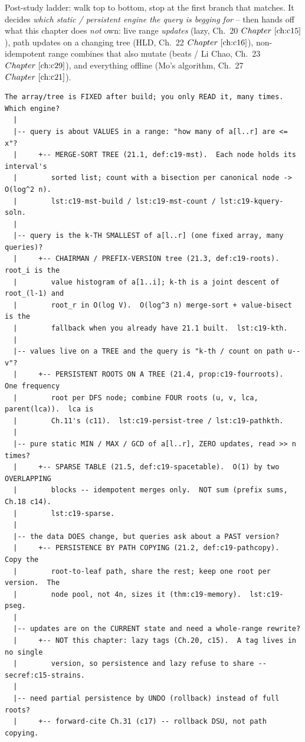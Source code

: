 
Post-study ladder: walk top to bottom, stop at the first branch that matches. It decides
\emph{which static / persistent engine the query is begging for} -- then hands off what this
chapter does \emph{not} own: live range \emph{updates} (lazy, Ch.~20 \(\chref{c15}\)),
path updates on a changing tree (HLD, Ch.~22 \(\chref{c16}\)), non-idempotent range
combines that also mutate (beats / Li Chao, Ch.~23 \(\chref{c29}\)), and everything offline
(Mo's algorithm, Ch.~27 \(\chref{c21}\)).

\begin{lstlisting}[language={}, basicstyle=\ttfamily\small, numbers=none, frame=single]
  The array/tree is FIXED after build; you only READ it, many times.  Which engine?
  |
  |-- query is about VALUES in a range: "how many of a[l..r] are <= x"?
  |     +-- MERGE-SORT TREE (21.1, def:c19-mst).  Each node holds its interval's
  |        sorted list; count with a bisection per canonical node -> O(log^2 n).
  |        lst:c19-mst-build / lst:c19-mst-count / lst:c19-kquery-soln.
  |
  |-- query is the k-TH SMALLEST of a[l..r] (one fixed array, many queries)?
  |     +-- CHAIRMAN / PREFIX-VERSION tree (21.3, def:c19-roots).  root_i is the
  |        value histogram of a[1..i]; k-th is a joint descent of root_(l-1) and
  |        root_r in O(log V).  O(log^3 n) merge-sort + value-bisect is the
  |        fallback when you already have 21.1 built.  lst:c19-kth.
  |
  |-- values live on a TREE and the query is "k-th / count on path u--v"?
  |     +-- PERSISTENT ROOTS ON A TREE (21.4, prop:c19-fourroots).  One frequency
  |        root per DFS node; combine FOUR roots (u, v, lca, parent(lca)).  lca is
  |        Ch.11's (c11).  lst:c19-persist-tree / lst:c19-pathkth.
  |
  |-- pure static MIN / MAX / GCD of a[l..r], ZERO updates, read >> n times?
  |     +-- SPARSE TABLE (21.5, def:c19-spacetable).  O(1) by two OVERLAPPING
  |        blocks -- idempotent merges only.  NOT sum (prefix sums, Ch.18 c14).
  |        lst:c19-sparse.
  |
  |-- the data DOES change, but queries ask about a PAST version?
  |     +-- PERSISTENCE BY PATH COPYING (21.2, def:c19-pathcopy).  Copy the
  |        root-to-leaf path, share the rest; keep one root per version.  The
  |        node pool, not 4n, sizes it (thm:c19-memory).  lst:c19-pseg.
  |
  |-- updates are on the CURRENT state and need a whole-range rewrite?
  |     +-- NOT this chapter: lazy tags (Ch.20, c15).  A tag lives in no single
  |        version, so persistence and lazy refuse to share -- secref:c15-strains.
  |
  |-- need partial persistence by UNDO (rollback) instead of full roots?
  |     +-- forward-cite Ch.31 (c17) -- rollback DSU, not path copying.
\end{lstlisting}

